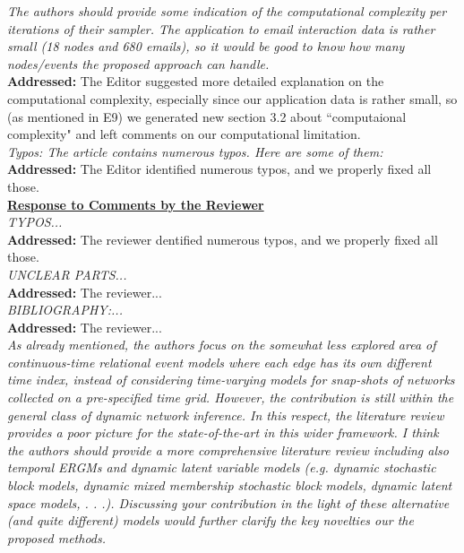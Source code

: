 \documentclass[12pt]{article}
\newcommand{\grey}[1]{{\color{mygrey}#1}}
\theoremstyle{definition}
\begin{document}
 \grey{\emph{The authors should provide some indication of the computational complexity per iterations of their sampler. The application to email interaction data is rather small (18 nodes and 680 emails), so it would be good to know how many nodes/events the proposed approach can handle.}}\\

\noindent \textcolor{MyGreen}{\textbf{Addressed:}} The Editor suggested more detailed explanation on the computational complexity, especially since our application data is rather small, so (as mentioned in E9) we generated new section 3.2 about ``computaional complexity" and left comments on our computational limitation.\\



 \grey{\emph{Typos: The article contains numerous typos. Here are some of them:}}\\

\noindent \textcolor{MyGreen}{\textbf{Addressed:}} The Editor identified numerous typos, and we properly fixed all those. \\



\noindent \underline{\textbf{Response to Comments by the Reviewer}}\\

 \grey{\emph{ TYPOS...}}\\

\noindent \textcolor{MyGreen}{\textbf{Addressed:}} The reviewer dentified numerous typos, and we properly fixed all those.  \\

 \grey{\emph{UNCLEAR PARTS...}}\\

\noindent \textcolor{MyGreen}{\textbf{Addressed:}} The reviewer... \\


 \grey{\emph{BIBLIOGRAPHY:...}}\\

\noindent \textcolor{MyGreen}{\textbf{Addressed:}} The reviewer... \\


 \grey{\emph{As already mentioned, the authors focus on the somewhat less explored area of continuous-time relational event models where each edge has its own different time index, instead of considering time-varying models for snap-shots of networks collected on a pre-specified time grid. However, the contribution is still within the general class of dynamic network inference. In this respect, the literature review provides a poor picture for the state-of-the-art in this wider framework. I think the authors should provide a more comprehensive literature review including also temporal ERGMs and dynamic latent variable models (e.g. dynamic stochastic block models, dynamic mixed membership stochastic block models, dynamic latent space models, . . .). Discussing your contribution in the light of these alternative (and quite different) models would further clarify the key novelties our the proposed methods.}}\\
\end{document}
